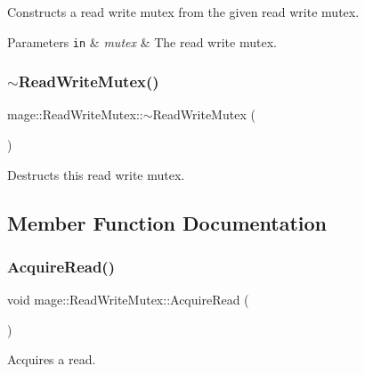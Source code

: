 Constructs a read write mutex from the given read write mutex.


\begin{DoxyParams}[1]{Parameters}
\mbox{\tt in}  & {\em mutex} & The read write mutex. \\
\hline
\end{DoxyParams}
\hypertarget{classmage_1_1_read_write_mutex_a73676d9414658d63edfe443ee1d55c8b}{}\label{classmage_1_1_read_write_mutex_a73676d9414658d63edfe443ee1d55c8b} 
\subsubsection{\texorpdfstring{$\sim$\+Read\+Write\+Mutex()}{~ReadWriteMutex()}}
{\footnotesize\ttfamily mage\+::\+Read\+Write\+Mutex\+::$\sim$\+Read\+Write\+Mutex (\begin{DoxyParamCaption}{ }\end{DoxyParamCaption})}

Destructs this read write mutex. 

\subsection{Member Function Documentation}
\hypertarget{classmage_1_1_read_write_mutex_af78045647078aaf3966c8f1b06e35c92}{}\label{classmage_1_1_read_write_mutex_af78045647078aaf3966c8f1b06e35c92} 
\subsubsection{\texorpdfstring{Acquire\+Read()}{AcquireRead()}}
{\footnotesize\ttfamily void mage\+::\+Read\+Write\+Mutex\+::\+Acquire\+Read (\begin{DoxyParamCaption}{ }\end{DoxyParamCaption})\hspace{0.3cm}{\ttfamily [private]}}

Acquires a read. \hypertarget{classmage_1_1_read_write_mutex_a76137013107a9c2c1fc05c1e0747965e}{}\label{classmage_1_1_read_write_mutex_a76137013107a9c2c1fc05c1e0747965e} 
